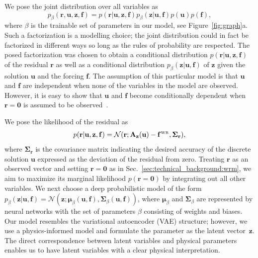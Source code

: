 \documentclass[11pt, fleqn]{article}
\def\bfSigma{{\mathbf \Sigma}}
\def\A{{\mathbf A}}
\def\z{{\mathbf z}}
\def\fbf{{\mathbf f}}
\def\ubf{{\mathbf u}}
\def\r{{\mathbf r}}
\def\NPDF{{\mathcal N}}
\def \fbfWR {{\fbf^{\text{\tiny WR}}}}
\def \bmu {{\boldsymbol \mu}}
\def \bSigma {{\mathbf \Sigma}}
\begin{document}
We pose the joint distribution over all variables as
\begin{equation}\label{eq:joint_probability_model_dataless}
    p_{\beta}(\r,\ubf,\z,\fbf) = p(\r | \ubf, \z,  \fbf) p_{\beta}(\z|\ubf,\fbf) p(\ubf) p(\fbf),
\end{equation}
where $\beta$ is the trainable set of parameters in our model, see Figure~\ref{fig:graph}a.  Such a factorization is a modelling choice; the joint distribution could in fact be factorized in different ways so long as the rules of probability are respected. 
The posed factorization was chosen to obtain a conditional distribution $p(\r|\ubf, \z, \fbf)$ of the residual $\r$ as well as a conditional distribution $p_\beta(\z|\ubf, \fbf)$ of $\z$ given the solution $\ubf$ and the forcing $\fbf$. The assumption of this particular model is that $\ubf$ and $\fbf$ are independent when none of the variables in the model are observed. However, it is easy to show that $\ubf$ and $\fbf$  become  conditionally dependent when $\r = \mathbf{0}$ is assumed to be observed~\cite{Bishop2006}. 

We pose the likelihood of the residual as
\begin{equation}\label{eq:likelihood_of_r_u}
    p(\r| \ubf,\z,\fbf) = \NPDF(\r; \A_{\z}(\ubf) - \fbfWR , \mathbf{\Sigma}_\r),
\end{equation}
where $\bfSigma_{\r}$ is the covariance matrix indicating the desired accuracy of the discrete solution $\ubf$ expressed as the deviation of the residual from zero.  
Treating $\r$ as an observed vector and setting $\r = \mathbf{0}$ as in Sec.~\ref{sec:technical_background:wrm}, we aim to maximize its marginal likelihood $p(\r = \mathbf{0})$ by integrating out all other variables.  We next choose a deep probabilistic model of the form $p_\beta(\z | \ubf, \fbf) = \NPDF(\z; \bmu_\beta(\ubf,\fbf), \bSigma_\beta(\ubf,\fbf))$, where $\bmu_\beta$ and $\bSigma_\beta$ are represented by neural networks with the set of parameters $\beta$ consisting of weights and biases. Our model resembles the variational autoencoder (VAE) structure; however, we use a physics-informed model and formulate the parameter as the latent vector~$\z$. The direct correspondence between latent variables and physical parameters enables us to have latent variables with a clear physical interpretation.  
\end{document}
